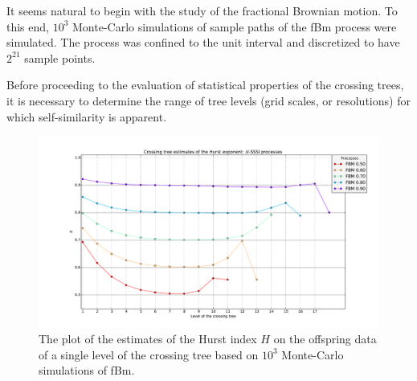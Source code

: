 \documentclass[a4paper]{article}
\begin{document}
It seems natural to begin with the study of the fractional Brownian motion. To this end,
$10^3$ Monte-Carlo simulations of sample paths of the fBm process were simulated. The
process was confined to the unit interval and discretized to have $2^{21}$ sample points.

Before proceeding to the evaluation of statistical properties of the crossing trees,
it is necessary to determine the range of tree levels (grid scales, or resolutions)
for which self-similarity is apparent.
\begin{figure}[htb]\begin{center}
    \includegraphics[width=6in]{images/fbm_fig_05_med_1000-21}
    \caption{The plot of the estimates of the Hurst index $H$ on the offspring data
    of a single level of the crossing tree based on $10^3$ Monte-Carlo simulations of
    fBm.}
\label{fig:fbm_hurst_crossing_tree}
\end{center}\end{figure}
\end{document}
